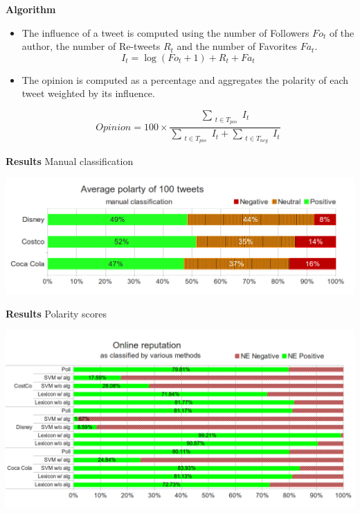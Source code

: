 \documentclass[landscape,20pt]{extarticle}
\newcommand*{\TitleFont}{\Huge \bf}
\begin{document}
\newpage
\thispagestyle{empty}
\mbox{}

\clearpage
\thispagestyle{empty}

{\TitleFont Algorithm}
\begin{itemize}
\item The influence of a tweet is computed using the number of Followers $Fo_t$ of the author, the number of Re-tweets $R_t$ and the number of Favorites $Fa_t$.
\begin{equation}
I_t = \log (Fo_t + 1) + R_t + Fa_t
\end{equation}

\item The opinion is computed as a percentage and aggregates the polarity of each tweet weighted by its influence.

\begin{equation}
Opinion = 100 \times \frac{\sum_{\substack{t \in T_{pos}}} I_t}{\sum_{\substack{t \in T_{pos}}} I_t + \sum_{\substack{t \in T_{neg}}} I_t}
\end{equation}

\end{itemize}

\newpage
\thispagestyle{empty}
\mbox{}

\clearpage
\thispagestyle{empty}

{\TitleFont Results}
\newline
\small{Manual classification}
\newline
\newline
\newline
\newline
\centerline{\includegraphics[scale=0.85]{../img/man1.png}}

\newpage
\thispagestyle{empty}
\mbox{}

\clearpage
\thispagestyle{empty}

{\TitleFont Results}
\newline
\small{Polarity scores}
\newline
\centerline{\includegraphics[scale=0.7]{../img/full1.png}}
\end{document}
